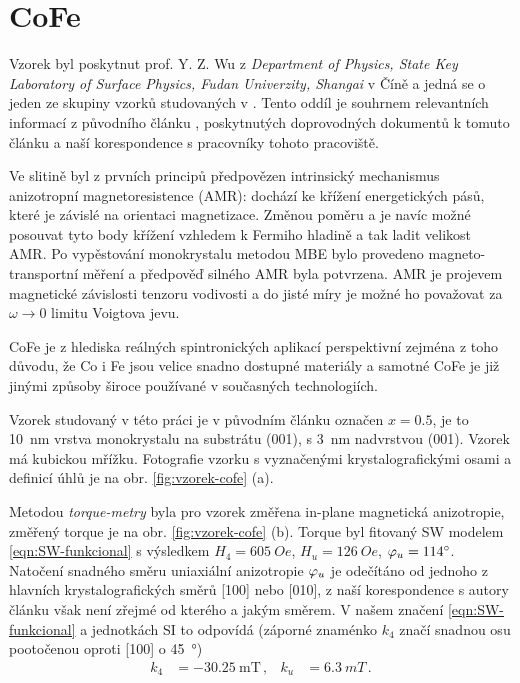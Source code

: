 \section{CoFe}
\label{chap:vzorek-cofe}

Vzorek byl poskytnut prof. Y. Z. Wu z \emph{Department of Physics, State Key Laboratory of Surface Physics, Fudan Univerzity, Shangai} v Číně a jedná se o jeden ze skupiny vzorků studovaných v \cite{zengIntrinsicMechanismAnisotropic2020}.
Tento oddíl je souhrnem relevantních informací z původního článku \cite{zengIntrinsicMechanismAnisotropic2020}, poskytnutých doprovodných dokumentů k tomuto článku a naší korespondence s pracovníky tohoto pracoviště.

Ve slitině  byl z prvních principů předpovězen intrinsický mechanismus anizotropní magnetoresistence (AMR): dochází ke křížení energetických pásů, které je závislé na orientaci magnetizace.
Změnou poměru  a  je navíc možné posouvat tyto body křížení vzhledem k Fermiho hladině a tak ladit velikost AMR.
Po vypěstování monokrystalu metodou MBE bylo provedeno magneto-transportní měření a předpověď silného AMR byla potvrzena\cite{zengIntrinsicMechanismAnisotropic2020}.
AMR je projevem magnetické závislosti tenzoru vodivosti a do jisté míry je možné ho považovat za $\omega\to 0$ limitu Voigtova jevu\cite{tesarovaSystematicStudyMagnetic2014}.

CoFe je z hlediska reálných spintronických aplikací perspektivní zejména z toho důvodu, že Co i Fe jsou velice snadno dostupné materiály a samotné CoFe je již jinými způsoby široce používané v současných technologiích.

Vzorek studovaný v této práci je v původním článku označen $x=0.5$, je to \SI{10}{\nano\meter} vrstva monokrystalu  na substrátu (001), s \SI{3}{\nano\meter} nadvrstvou (001).
Vzorek má kubickou mřížku.
Fotografie vzorku s vyznačenými krystalografickými osami a definicí úhlů je na obr. \ref{fig:vzorek-cofe} (a).

Metodou \emph{torque-metry} byla pro vzorek změřena in-plane magnetická ani\-zo\-tro\-pie, změřený torque je na obr. \ref{fig:vzorek-cofe} (b).
Torque byl fitovaný SW modelem \eqref{eqn:SW-funkcional} s výsledkem $H_4=\SI{605}{Oe}$, $H_u=\SI{126}{Oe}$, $\varphi_u=\SI{114}{\degree}$.
Natočení snadného směru uniaxiální anizotropie $\varphi_u$ je odečítáno od jednoho z hlavních krystalografických směrů [100] nebo [010], z naší korespondence s autory článku \cite{zengIntrinsicMechanismAnisotropic2020} však není zřejmé od kterého a jakým směrem.
V našem značení \eqref{eqn:SW-funkcional} a jednotkách SI to odpovídá (záporné znaménko $k_4$ značí snadnou osu pootočenou oproti [100] o \SI{45}{\degree})
\begin{align}
\label{eqn:cofe-anizotropni-konstanty-cina}
k_4 &= -\SI{30.25}{\milli\tesla} \,, & k_u &= \SI{6.3}{mT} \,.
\end{align}

